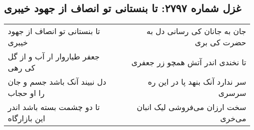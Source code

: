\begin{center}
\section*{غزل شماره ۲۷۹۷: تا بنستانی تو انصاف از جهود خیبری}
\label{sec:2797}
\begin{longtable}{l p{0.5cm} r}
تا بنستانی تو انصاف از جهود خیبری
&&
جان به جانان کی رسانی دل به حضرت کی بری
\\
جعفر طیاروار ار آب و از گل کی رهی
&&
تا نخندی اندر آتش همچو زر جعفری
\\
دل نبیند آنک باشد جسم و جان را او حجاب
&&
سر ندارد آنک بنهد پا در این ره سرسری
\\
تا دو چشمت بسته باشد اندر این بازارگاه
&&
سخت ارزان می‌فروشی لیک انبان می‌خری
\\
\end{longtable}
\end{center}
